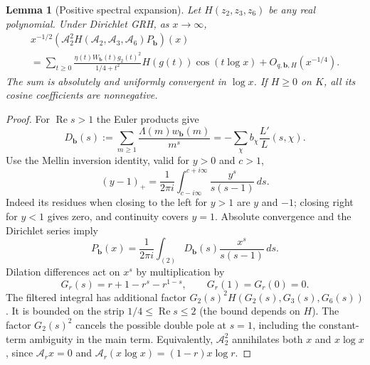 \documentclass[11pt]{article}
\newtheorem{lemma}[theorem]{Lemma}
\theoremstyle{remark}\newtheorem{remark}[theorem]{Remark}
\newcommand{\Rea}{\operatorname{Re}}\newcommand{\ord}{\operatorname{ord}}
\newcommand{\A}{\mathcal A}
\newcommand{\bb}{\boldsymbol b}
\begin{document}
\begin{lemma}[Positive spectral expansion]\label{lem:formula}
Let $H(z_2,z_3,z_6)$ be any real polynomial. Under Dirichlet GRH, as $x\to\infty$,
\begin{multline}\label{eq:expansion}
 x^{-1/2}(\A_2^2 H(\A_2,\A_3,\A_6)P_{\bb})(x)\\
 =\sum_{t\ge0}\frac{\eta(t)W_{\bb}(t)g_2(t)^2}{1/4+t^2}
 H(g(t))\cos(t\log x)+O_{q,\bb,H}(x^{-1/4}).
\end{multline}
The sum is absolutely and uniformly convergent in $\log x$. If $H\ge0$ on $K$, all its cosine coefficients are nonnegative.
\end{lemma}
\begin{proof}
For $\Rea s>1$ the Euler products give
\[
 D_{\bb}(s):=\sum_{m\ge1}\frac{\Lambda(m)w_{\bb}(m)}{m^s}
 =-\sum_\chi b_\chi\frac{L'}{L}(s,\chi).
\]
Use the Mellin inversion identity, valid for $y>0$ and $c>1$,
\[
 (y-1)_+=\frac{1}{2\pi i}\int_{c-i\infty}^{c+i\infty}
 \frac{y^s}{s(s-1)}\,ds.
\]
Indeed its residues when closing to the left for $y>1$ are $y$ and $-1$; closing right for $y<1$ gives zero, and continuity covers $y=1$. Absolute convergence and the Dirichlet series imply
\begin{equation}\label{eq:perron}
 P_{\bb}(x)=\frac1{2\pi i}\int_{(2)}D_{\bb}(s)\frac{x^s}{s(s-1)}\,ds.
\end{equation}
Dilation differences act on $x^s$ by multiplication by
\[
 G_r(s)=r+1-r^s-r^{1-s},\qquad G_r(1)=G_r(0)=0.
\]
The filtered integral has additional factor $G_2(s)^2 H(G_2(s),G_3(s),G_6(s))$. It is bounded on the strip $1/4\le\Rea s\le2$ (the bound depends on $H$). The factor $G_2(s)^2$ cancels the possible double pole at $s=1$, including the constant-term ambiguity in the main term. Equivalently, $\A_2^2$ annihilates both $x$ and $x\log x$, since $\A_r x=0$ and $\A_r(x\log x)=(1-r)x\log r$.


\end{proof}
\end{document}
